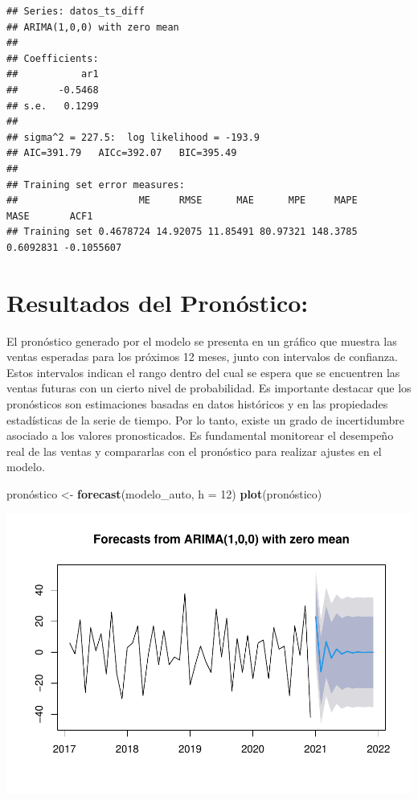 \documentclass[
]{book}
\newenvironment{Shaded}{\begin{snugshade}}{\end{snugshade}}
\newcommand{\AttributeTok}[1]{\textcolor[rgb]{0.13,0.29,0.53}{#1}}
\newcommand{\DecValTok}[1]{\textcolor[rgb]{0.00,0.00,0.81}{#1}}
\newcommand{\FunctionTok}[1]{\textcolor[rgb]{0.13,0.29,0.53}{\textbf{#1}}}
\newcommand{\NormalTok}[1]{#1}
\newcommand{\OtherTok}[1]{\textcolor[rgb]{0.56,0.35,0.01}{#1}}
\begin{document}
\begin{verbatim}
## Series: datos_ts_diff 
## ARIMA(1,0,0) with zero mean 
## 
## Coefficients:
##           ar1
##       -0.5468
## s.e.   0.1299
## 
## sigma^2 = 227.5:  log likelihood = -193.9
## AIC=391.79   AICc=392.07   BIC=395.49
## 
## Training set error measures:
##                     ME     RMSE      MAE      MPE     MAPE      MASE       ACF1
## Training set 0.4678724 14.92075 11.85491 80.97321 148.3785 0.6092831 -0.1055607
\end{verbatim}

\section{\texorpdfstring{\textbf{Resultados del Pronóstico:}}{Resultados del Pronóstico:}}\label{resultados-del-pronuxf3stico}

El pronóstico generado por el modelo se presenta en un gráfico que muestra las ventas esperadas para los próximos 12 meses, junto con intervalos de confianza. Estos intervalos indican el rango dentro del cual se espera que se encuentren las ventas futuras con un cierto nivel de probabilidad. Es importante destacar que los pronósticos son estimaciones basadas en datos históricos y en las propiedades estadísticas de la serie de tiempo. Por lo tanto, existe un grado de incertidumbre asociado a los valores pronosticados. Es fundamental monitorear el desempeño real de las ventas y compararlas con el pronóstico para realizar ajustes en el modelo.

\begin{Shaded}
\begin{Highlighting}[]
\NormalTok{pronóstico }\OtherTok{\textless{}{-}} \FunctionTok{forecast}\NormalTok{(modelo\_auto, }\AttributeTok{h =} \DecValTok{12}\NormalTok{) }
\FunctionTok{plot}\NormalTok{(pronóstico)}
\end{Highlighting}
\end{Shaded}

\includegraphics{_main_files/figure-latex/unnamed-chunk-31-1.pdf}
\end{document}
